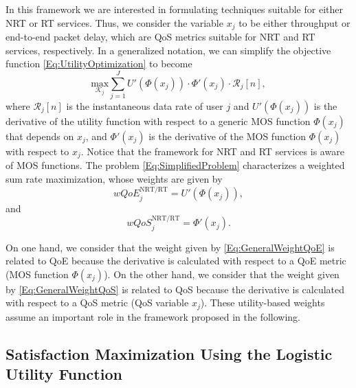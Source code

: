 \documentclass[12pt]{article}
\begin{document}
In this framework we are interested in formulating techniques suitable for either \ac{NRT} or \ac{RT} services. Thus, we consider the variable $x_j$ to be either throughput or end-to-end packet delay, which are \ac{QoS} metrics suitable for \ac{NRT} and \ac{RT} services, respectively. In a generalized notation, we can simplify the objective function \eqref{Eq:UtilityOptimization} to become
%
\begin{equation}
\label{Eq:SimplifiedProblem}
\underset{\mathcal{K}_j}{\text{max}}\sum_{j=1}^{J} U'\left(\Phi(x_j)\right)\cdot \Phi'(x_j) \cdot \mathcal{R}_j[n],
\end{equation}
where $\mathcal{R}_j[n]$ is the instantaneous data rate of user $j$ and $U'\left(\Phi(x_j)\right)$ is the derivative of the utility function with respect to a generic \ac{MOS} function $\Phi(x_j)$  that depends on $x_j$, and  $\Phi'(x_j)$ is the derivative of the \ac{MOS} function $\Phi(x_j)$ with respect to $ x_j $. Notice that the framework  for \ac{NRT} and \ac{RT} services is aware of \ac{MOS} functions. The problem \eqref{Eq:SimplifiedProblem}  characterizes a weighted sum rate maximization, whose weights are given by
\begin{equation}
\label{Eq:GeneralWeightQoE}
wQoE_{j}^\text{NRT/RT} = U'(\Phi(x_j)),
\end{equation} 
and 
\begin{equation}
\label{Eq:GeneralWeightQoS}	
wQoS_{j}^\text{NRT/RT} = \Phi'(x_j).
\end{equation} 

On one hand, we consider that the weight given by \eqref{Eq:GeneralWeightQoE} is related to QoE because the derivative is calculated with respect to a \ac{QoE} metric (\ac{MOS} function $\Phi(x_j)$). On the other hand, we consider that the weight given by \eqref{Eq:GeneralWeightQoS} is related to \ac{QoS} because the derivative is calculated with respect to a \ac{QoS} metric (\ac{QoS} variable $x_j$). These utility-based weights assume an important role in the framework proposed in the following.

\subsection{Satisfaction Maximization Using the Logistic Utility Function}
\label{Sec:maxUtil}
\end{document}
